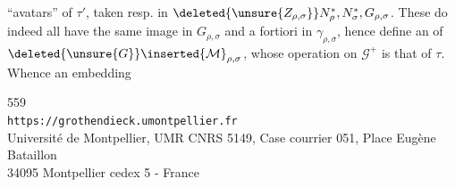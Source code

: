 ``avatars'' of \(\tau'\), taken resp. in
\(\deleted{\unsure{Z_{\rho,\sigma}}}
N_\rho^*,N_\sigma^*,G_{\rho,\sigma}\).
These do indeed all have the same image in
\(G_{\rho,\sigma}\) and a fortiori in \(\gamma_{\rho,\sigma}\),
hence define an  of
\(\deleted{\unsure{G}}\inserted{\mathcal M}_{\rho,\sigma}\),
whose operation on \(\mathcal G^+\) is that of \(\tau\).
Whence an embedding


{\small
\begin{center}
559\\
\texttt{https://grothendieck.umontpellier.fr}\\
Université de Montpellier, UMR CNRS 5149, Case courrier 051, Place Eugène Bataillon\\
34095 Montpellier cedex 5 - France
\end{center}
}


